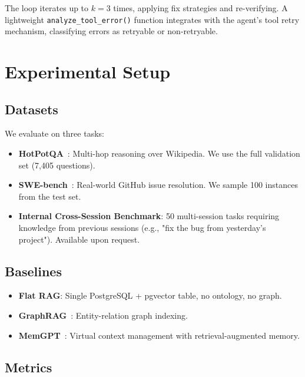 \documentclass[11pt,a4paper]{article}
\begin{document}
The loop iterates up to $k=3$ times, applying fix strategies and re-verifying.
A lightweight \texttt{analyze\_tool\_error()} function integrates with 
the agent's tool retry mechanism, classifying errors as retryable or non-retryable.

\section{Experimental Setup}
\label{sec:experiments}

\subsection{Datasets}

We evaluate on three tasks:

\begin{itemize}
    \item \textbf{HotPotQA}~\citep{yang2018hotpotqa}: Multi-hop reasoning over Wikipedia. 
    We use the full validation set (7,405 questions).
    \item \textbf{SWE-bench}~\citep{jimenez2024swebench}: Real-world GitHub issue resolution. 
    We sample 100 instances from the test set.
    \item \textbf{Internal Cross-Session Benchmark}: 50 multi-session tasks requiring 
    knowledge from previous sessions (e.g., "fix the bug from yesterday's project"). 
    Available upon request.
\end{itemize}

\subsection{Baselines}

\begin{itemize}
    \item \textbf{Flat RAG}: Single PostgreSQL + pgvector table, no ontology, no graph.
    \item \textbf{GraphRAG}~\citep{edge2024graphrag}: Entity-relation graph indexing.
    \item \textbf{MemGPT}~\citep{zhang2024memgpt}: Virtual context management with 
    retrieval-augmented memory.
\end{itemize}

\subsection{Metrics}
\end{document}
